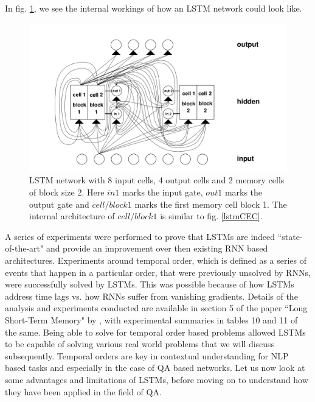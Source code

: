 \documentclass[12pt]{report}
\begin{document}
            In fig. \ref{lstmNetwork}, we see the internal workings of how an LSTM network could look like.
            \begin{figure}[!h]
	           \centering
               \includegraphics[scale=0.35]{../images/lstm-network.png}
      		   \caption{LSTM network with 8 input cells, 4 output cells and 2 memory cells of block size 2. Here $ in1 $ marks the input gate, $ out1 $ marks the output gate and $ cell/block1 $ marks the first memory cell block 1. The internal architecture of $ cell/block1 $ is similar to fig. \ref{lstmCEC}. \citep{lstmoriginal}}\label{lstmNetwork}
            \end{figure}

            A series of experiments were performed to prove that LSTMs are indeed ``state-of-the-art" and provide an improvement over then existing RNN based architectures.
            Experiments around temporal order, which is defined as a series of events that happen in a particular order, that were previously unsolved by RNNs, were successfully solved by LSTMs. This was possible because of how LSTMs address time lags vs. how RNNs suffer from vanishing gradients. Details of the analysis and experiments conducted are available in section 5 of the paper ``Long Short-Term Memory" by \cite{lstmoriginal}, with experimental summaries in tables 10 and 11 of the same. Being able to solve for temporal order based problems allowed LSTMs to be capable of solving various real world problems that we will discuss subsequently.
            Temporal orders are key in contextual understanding for NLP based tasks and especially in the case of QA based networks. Let us now look at some advantages and limitations of LSTMs, before moving on to understand how they have been applied in the field of QA.
\end{document}
